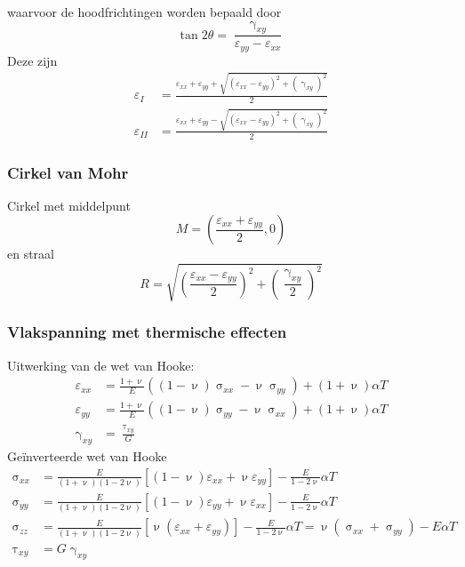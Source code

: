             waarvoor de hoodfrichtingen worden bepaald door
            \begin{equation}
                \tan2\theta = \frac{\upgamma_{xy}}{\varepsilon_{yy}-\varepsilon_{xx}}
            \end{equation}
            Deze zijn
            \begin{align}
                \varepsilon_I &= \frac{\varepsilon_{xx}+\varepsilon_{yy}+\sqrt{(\varepsilon_{xx}-\varepsilon_{yy})^2+(\upgamma_{xy})^2}}{2}\nonumber\\
                \varepsilon_{II} &= \frac{\varepsilon_{xx}+\varepsilon_{yy}-\sqrt{(\varepsilon_{xx}-\varepsilon_{yy})^2+(\upgamma_{xy})^2}}{2}
            \end{align}

        \subsubsection{Cirkel van Mohr}

            Cirkel met middelpunt
            \begin{equation}
                M = \left(\frac{\varepsilon_{xx}+\varepsilon_{yy}}{2},0\right)
            \end{equation}
            en straal
            \begin{equation}
                R = \sqrt{\left(\frac{\varepsilon_{xx}-\varepsilon_{yy}}{2}\right)^2+\left(\frac{\upgamma_{xy}}{2}\right)^2}
            \end{equation}

        \subsubsection{Vlakspanning met thermische effecten}
            
            Uitwerking van de wet van Hooke:
            \begin{align}
                \varepsilon_{xx} &= \frac{1+\upnu}{E}\left((1-\upnu)\upsigma_{xx} - \upnu\upsigma_{yy}\right) + (1+\upnu)\alpha T\nonumber\\
                \varepsilon_{yy} &= \frac{1+\upnu}{E}\left((1-\upnu)\upsigma_{yy} - \upnu\upsigma_{xx}\right) + (1+\upnu)\alpha T\\
                \upgamma_{xy} &= \frac{\uptau_{xy}}{G}\nonumber
            \end{align}
            Geïnverteerde wet van Hooke
            \begin{align}
                \upsigma_{xx} &= \frac{E}{(1+\upnu)(1-2\upnu)}\left[(1-\upnu)\varepsilon_{xx}+\upnu\varepsilon_{yy}\right] -\frac{E}{1-2\upnu}\alpha T\nonumber\\
                \upsigma_{yy} &= \frac{E}{(1+\upnu)(1-2\upnu)}\left[(1-\upnu)\varepsilon_{yy}+\upnu\varepsilon_{xx}\right] -\frac{E}{1-2\upnu}\alpha T\nonumber\\
                \upsigma_{zz} &= \frac{E}{(1+\upnu)(1-2\upnu)}\left[\upnu(\varepsilon_{xx}+\varepsilon_{yy})\right] -\frac{E}{1-2\upnu}\alpha T= \upnu(\upsigma_{xx}+\upsigma_{yy}) - E\alpha T\\
                \uptau_{xy} &= G\upgamma_{xy}\nonumber
            \end{align}

